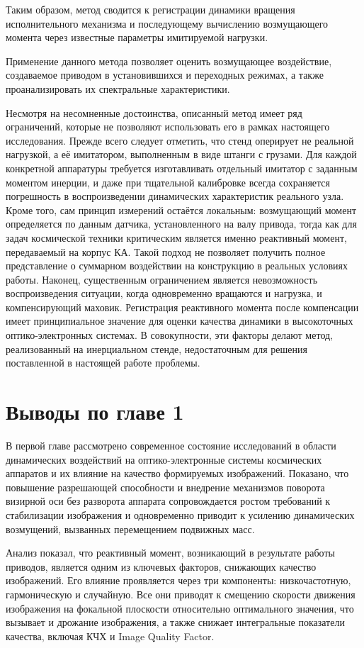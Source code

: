 Таким образом, метод сводится к регистрации динамики вращения исполнительного механизма и последующему вычислению возмущающего момента через известные параметры имитируемой нагрузки.

Применение данного метода позволяет оценить возмущающее воздействие, создаваемое приводом в установившихся и переходных режимах, а также проанализировать их спектральные характеристики.

Несмотря на несомненные достоинства, описанный метод имеет ряд ограничений, которые не позволяют использовать его в рамках настоящего исследования. Прежде всего следует отметить, что стенд оперирует не реальной нагрузкой, а её имитатором, выполненным в виде штанги с грузами. Для каждой конкретной аппаратуры требуется изготавливать отдельный имитатор с заданным моментом инерции, и даже при тщательной калибровке всегда сохраняется погрешность в воспроизведении динамических характеристик реального узла. Кроме того, сам принцип измерений остаётся локальным: возмущающий момент определяется по данным датчика, установленного на валу привода, тогда как для задач космической техники критическим является именно реактивный момент, передаваемый на корпус КА. Такой подход не позволяет получить полное представление о суммарном воздействии на конструкцию в реальных условиях работы. Наконец, существенным ограничением является невозможность воспроизведения ситуации, когда одновременно вращаются и нагрузка, и компенсирующий маховик. Регистрация реактивного момента после компенсации имеет принципиальное значение для оценки качества динамики в высокоточных оптико-электронных системах. В совокупности, эти факторы делают метод, реализованный на инерциальном стенде, недостаточным для решения поставленной в настоящей работе проблемы.

\section*{Выводы по главе 1}
В первой главе рассмотрено современное состояние исследований в области динамических воздействий на оптико-электронные системы космических аппаратов и их влияние на качество формируемых изображений. Показано, что повышение разрешающей способности и внедрение механизмов поворота визирной оси без разворота аппарата сопровождается ростом требований к стабилизации изображения и одновременно приводит к усилению динамических возмущений, вызванных перемещением подвижных масс.

Анализ показал, что реактивный момент, возникающий в результате работы приводов, является одним из ключевых факторов, снижающих качество изображений. Его влияние проявляется через три компоненты: низкочастотную, гармоническую и случайную. Все они приводят к смещению скорости движения изображения на фокальной плоскости относительно оптимального значения, что вызывает  и дрожание изображения, а также снижает интегральные показатели качества, включая КЧХ и Image Quality Factor.

